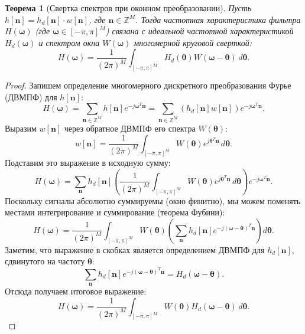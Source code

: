 \documentclass[12pt, a4paper]{article}
\theoremstyle{definition}
\theoremstyle{plain}
\newtheorem{theorem}{Теорема}
\begin{document}
\begin{theorem}[Свертка спектров при оконном преобразовании]
Пусть $h[\mathbf{n}] = h_d[\mathbf{n}] \cdot w[\mathbf{n}]$, где $\mathbf{n} \in \mathbb{Z}^M$. Тогда частотная характеристика фильтра $H(\bm{\omega})$ (где $\bm{\omega} \in [-\pi, \pi]^M$) связана с идеальной частотной характеристикой $H_d(\bm{\omega})$ и спектром окна $W(\bm{\omega})$ многомерной круговой сверткой:
\begin{equation}
    H(\bm{\omega}) = \frac{1}{(2\pi)^M} \int_{[-\pi, \pi]^M} H_d(\bm{\theta}) W(\bm{\omega} - \bm{\theta}) \, d\bm{\theta}.
\end{equation}
\end{theorem}
\begin{proof}
Запишем определение многомерного дискретного преобразования Фурье (ДВМПФ) для $h[\mathbf{n}]$:
\begin{equation}
    H(\bm{\omega}) = \sum_{\mathbf{n} \in \mathbb{Z}^M} h[\mathbf{n}] e^{-j \bm{\omega}^T \mathbf{n}} = \sum_{\mathbf{n} \in \mathbb{Z}^M} \left( h_d[\mathbf{n}] w[\mathbf{n}] \right) e^{-j \bm{\omega}^T \mathbf{n}}.
\end{equation}
Выразим $w[\mathbf{n}]$ через обратное ДВМПФ его спектра $W(\bm{\theta})$:
\begin{equation}
    w[\mathbf{n}] = \frac{1}{(2\pi)^M} \int_{[-\pi, \pi]^M} W(\bm{\theta}) e^{j \bm{\theta}^T \mathbf{n}} \, d\bm{\theta}.
\end{equation}
Подставим это выражение в исходную сумму:
\begin{equation}
    H(\bm{\omega}) = \sum_{\mathbf{n}} h_d[\mathbf{n}] \left( \frac{1}{(2\pi)^M} \int_{[-\pi, \pi]^M} W(\bm{\theta}) e^{j \bm{\theta}^T \mathbf{n}} \, d\bm{\theta} \right) e^{-j \bm{\omega}^T \mathbf{n}}.
\end{equation}
Поскольку сигналы абсолютно суммируемы (окно финитно), мы можем поменять местами интегрирование и суммирование (теорема Фубини):
\begin{equation}
    H(\bm{\omega}) = \frac{1}{(2\pi)^M} \int_{[-\pi, \pi]^M} W(\bm{\theta}) \left( \sum_{\mathbf{n}} h_d[\mathbf{n}] e^{-j (\bm{\omega} - \bm{\theta})^T \mathbf{n}} \right) d\bm{\theta}.
\end{equation}
Заметим, что выражение в скобках является определением ДВМПФ для $h_d[\mathbf{n}]$, сдвинутого на частоту $\bm{\theta}$:
\begin{equation}
    \sum_{\mathbf{n}} h_d[\mathbf{n}] e^{-j (\bm{\omega} - \bm{\theta})^T \mathbf{n}} = H_d(\bm{\omega} - \bm{\theta}).
\end{equation}
Отсюда получаем итоговое выражение:
\begin{equation}
    H(\bm{\omega}) = \frac{1}{(2\pi)^M} \int_{[-\pi, \pi]^M} W(\bm{\theta}) H_d(\bm{\omega} - \bm{\theta}) \, d\bm{\theta}.
\end{equation}
\end{proof}
\end{document}

